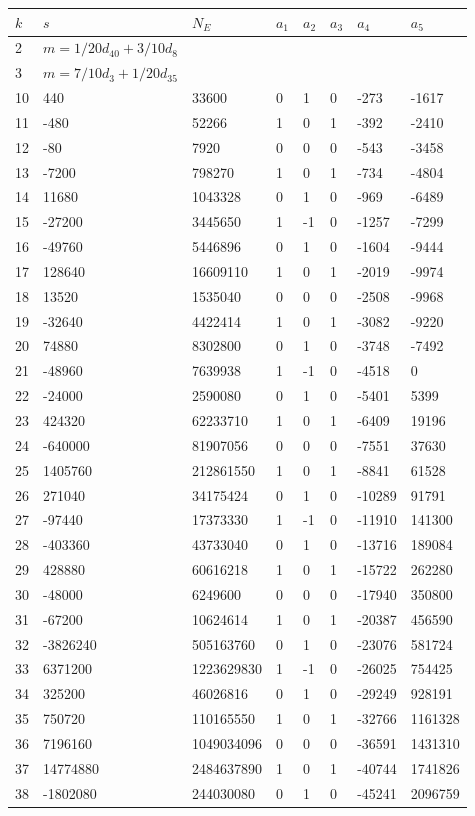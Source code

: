 \documentclass{amsart}
\begin{document}
\begin{longtable}{|l|l|l|lllll|}
\hline
$k$ & $s$ & $N_E$ & $a_1$ & $a_2$ & $a_3$ & $a_4$ & $a_5$\\
\hline
2&$m=1/20d_{40}+3/10d_{8}$&&\multicolumn{5}{c|}{}\\
3&$m=7/10d_{3}+1/20d_{35}$&&\multicolumn{5}{c|}{}\\
10&440&33600&0&1&0&-273&-1617\\
11&-480&52266&1&0&1&-392&-2410\\
12&-80&7920&0&0&0&-543&-3458\\
13&-7200&798270&1&0&1&-734&-4804\\
14&11680&1043328&0&1&0&-969&-6489\\
15&-27200&3445650&1&-1&0&-1257&-7299\\
16&-49760&5446896&0&1&0&-1604&-9444\\
17&128640&16609110&1&0&1&-2019&-9974\\
18&13520&1535040&0&0&0&-2508&-9968\\
19&-32640&4422414&1&0&1&-3082&-9220\\
20&74880&8302800&0&1&0&-3748&-7492\\
21&-48960&7639938&1&-1&0&-4518&0\\
22&-24000&2590080&0&1&0&-5401&5399\\
23&424320&62233710&1&0&1&-6409&19196\\
24&-640000&81907056&0&0&0&-7551&37630\\
25&1405760&212861550&1&0&1&-8841&61528\\
26&271040&34175424&0&1&0&-10289&91791\\
27&-97440&17373330&1&-1&0&-11910&141300\\
28&-403360&43733040&0&1&0&-13716&189084\\
29&428880&60616218&1&0&1&-15722&262280\\
30&-48000&6249600&0&0&0&-17940&350800\\
31&-67200&10624614&1&0&1&-20387&456590\\
32&-3826240&505163760&0&1&0&-23076&581724\\
33&6371200&1223629830&1&-1&0&-26025&754425\\
34&325200&46026816&0&1&0&-29249&928191\\
35&750720&110165550&1&0&1&-32766&1161328\\
36&7196160&1049034096&0&0&0&-36591&1431310\\
37&14774880&2484637890&1&0&1&-40744&1741826\\
38&-1802080&244030080&0&1&0&-45241&2096759\\

\end{longtable}
\end{document}
